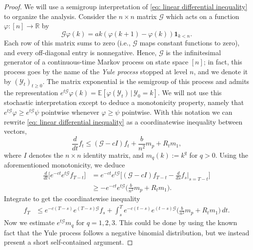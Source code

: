 \documentclass[10pt,a4paper]{amsart}
\def\E{{\mathbb E}}
\def\R{{\mathbb R}}
\begin{document}
\begin{proof}
We will use a semigroup interpretation of \eqref{eq: linear differential inequality} to organize the analysis.
Consider the $n \times n$ matrix $\mathcal G$ which acts on a function $\varphi : [n] \to \R$ by
\[\mathcal G \varphi(k)=ak(\varphi(k+1)-\varphi(k))\mathbf{1}_{k<n}.\]
Each row of this matrix sums to zero (i.e., $\mathcal G$ maps constant functions to zero), and every off-diagonal entry is nonnegative. Hence, $\mathcal G$ is the infinitesimal generator of a continuous-time Markov process on state space $[n]$; in fact, this process goes by the name of the \emph{Yule process} stopped at level $n$, and we denote it by $(\mathcal Y_t)_{t\geq 0}$. The matrix exponential is the semigroup of this process and admits the representation $e^{t\mathcal G}\varphi(k)=\E[\varphi(\mathcal Y_t)\,|\,\mathcal Y_0=k]$. We will not use this stochastic interpretation except to deduce a monotonicity property, namely that $e^{t\mathcal G}\varphi \ge e^{t\mathcal G}\psi$ pointwise whenever $\varphi \ge \psi$ pointwise.
With this notation we can rewrite \eqref{eq: linear differential inequality} as a coordinatewise inequality between vectors,
\begin{equation*}
    \frac{d}{dt}f_t \leq (\mathcal G - cI)f_t + \frac{b}{n^2}m_p + R_tm_1,
\end{equation*}
where $I$ denotes the $n \times n$ identity matrix, and $m_q(k) := k^q$ for $q > 0$.
Using the aforementioned monotonicity, we deduce
\begin{align*}
    \frac{d}{dt}\Big[e^{-ct} e^{t\mathcal G}f_{T-t} \Big] &= e^{-ct} e^{t\mathcal G}\Big[(\mathcal G - cI) f_{T-t}-\frac{d}{ds}f_{s}\big\vert_{s=T-t}\Big] \\
    &\ge - e^{-ct}e^{t\mathcal G}\big(\frac{b}{n^2}m_p + R_tm_1\big).
\end{align*}
Integrate to get the coordinatewise inequality
\begin{align}
\label{eq: semigroup after gronwall}
    f_{T} &\le e^{-c(T-s)}e^{(T-s)\mathcal G} f_s + \int_s^Te^{-c(t-s)}e^{(t-s)\mathcal G}\Big(\frac{b}{n^2} m_p + R_tm_1\Big)\,dt.
\end{align}
Now we estimate $e^{t\mathcal G}m_q$ for $q=1,2,3$. This could be done by using the known fact that the Yule process follows a negative binomial distribution, but we instead present a short self-contained argument. 


\end{proof}
\end{document}
